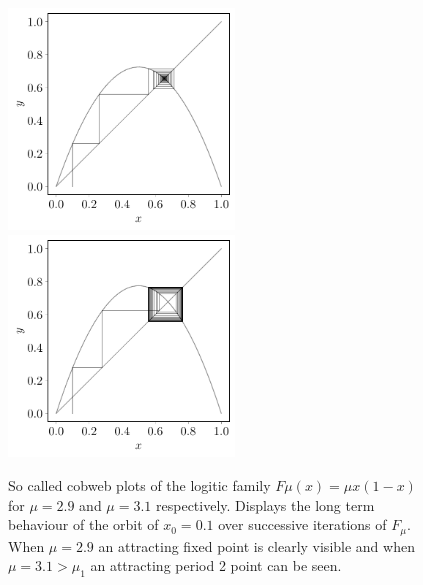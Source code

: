 \documentclass[11pt,a4paper,oneside]{memoir}
\theoremstyle{plain}
\theoremstyle{definition}
\begin{document}
\begin{figure}[h]
    \centering
    \includegraphics[width=6cm]{cobweb_0.1_2.9.pdf}
    \includegraphics[width=6cm]{cobweb_0.1_3.1.pdf}
    \caption{So called cobweb plots of the logitic family $F\mu(x) = \mu x(1-x)$ for $\mu = 2.9$ and $\mu = 3.1$ respectively. Displays the long term behaviour of the orbit of $x_0 = 0.1$ over successive iterations of $F_\mu$. When $\mu = 2.9$ an attracting fixed point is clearly visible and when $\mu = 3.1 > \mu_1$ an attracting period 2 point can be seen.}
    \label{fig:cobweb_2.9_3.1}
\end{figure}
\end{document}
